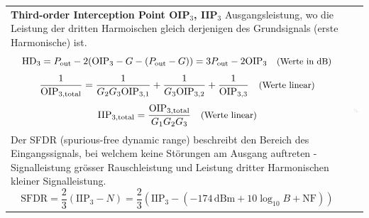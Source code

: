 \begin{tabular}{ll}
\parbox{10cm}{
    \textbf{Third-order Interception Point OIP$_3$, IIP$_3$} \\
    Ausgangsleistung, wo die Leistung der dritten Harmoischen gleich
    derjenigen des Grundsignals (erste Harmonische) ist.
    $$ \text{HD}_3
             = P_{\text{out}}-2(\text{OIP}_3-G-(P_{\text{out}}-G))
            = 3P_{\text{out}}-2\text{OIP}_3 \quad \text{\small{(Werte in dB)}}
            $$ $$  \frac 1{\text{OIP}_{3,\text{total}}} =
  \frac 1{G_2G_3\text{OIP}_{3,1}} +
  \frac 1{G_3\text{OIP}_{3,2}} +
  \frac 1{\text{OIP}_{3,3}} \quad \text{\small{(Werte linear)}}$$
$$  \text{IIP}_{3,\text{total}} =
  \frac{\text{OIP}_{3,\text{total}}}{G_1G_2G_3} \quad \text{\small{(Werte linear)}}$$     
  Der SFDR (spurious-free dynamic range) beschreibt den Bereich des
  Eingangssignals, bei welchem keine Störungen am Ausgang auftreten -
  Signalleistung grösser Rauschleistung und Leistung dritter Harmonischen kleiner
  Signalleistung.
  $$ \text{SFDR}= \frac 23(\text{IIP}_3-N) = \frac 23(\text{IIP}_3-(-174\,\text{dBm}
                 +10\log_{10} B + \text{NF})) $$
  
     }
& \parbox{8cm}{        
        \includegraphics[width=9cm]{./bilder/components_amplifier_nonlinear_xip3.png}
        }\\
\end{tabular}\\                      

